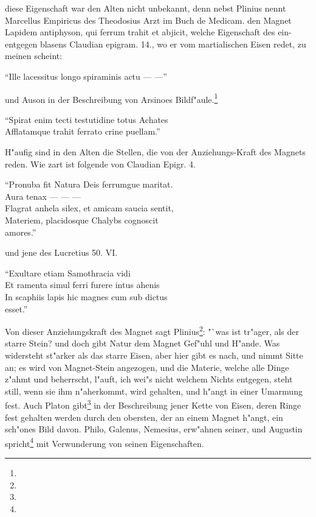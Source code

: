 \documentclass[a4paper, 11pt, oneside, polutonikogreek, german]{article}
\begin{document}
diese Eigenschaft war den Alten nicht unbekannt, denn nebst Plinius nennt Marcellus Empiricus des Theodosius Arzt im Buch de Medicam. den Magnet Lapidem antiphyson, qui ferrum trahit et abjicit, welche Eigenschaft des ein-entgegen blasens Claudian epigram. 14., wo er vom martialischen Eisen redet, zu meinen scheint:

"`Ille lacessitus longo spiraminis actu --- ---"'

und Auson in der Beschreibung von Arsinoes Bildf"aule.\footnote{}

"`Spirat enim tecti testutidine totus Achates\\
\hspace*{0.5cm} Afflatamque trahit ferrato crine puellam."'

H"aufig sind in den Alten die Stellen, die von der Anziehungs-Kraft des Magnets reden. Wie zart ist folgende von Claudian Epigr. 4.

"`Pronuba fit Natura Deis ferrumgue maritat.\\
\hspace*{0.5cm} Aura tenax --- --- ---\\
\hspace*{0.5cm} Flagrat anhela silex, et amicam saucia sentit,\\
\hspace*{0.5cm} Materiem, placidosque Chalybs cognoscit\\
\hspace*{1.5cm} amores."'

und jene des Lucretius 50. VI.

"`Exultare etiam Samothracia vidi\\
\hspace*{0.5cm} Et ramenta simul ferri furere intus ahenis\\
\hspace*{0.5cm} In scaphiis lapis hic magnes cum sub dictus\\
\hspace*{1.5cm} esset."'

Von dieser Anziehungskraft des Magnet sagt Plinius\footnote{}: "`was ist tr"ager, als der starre Stein? und doch gibt Natur dem Magnet Gef"uhl und H"ande. Was widersteht st"arker als das starre Eisen, aber hier gibt es nach, und nimmt Sitte an; es wird von Magnet-Stein angezogen, und die Materie, welche alle Dinge z"ahmt und beherrscht, l"auft, ich wei"s nicht welchem Nichts entgegen, steht still, wenn sie ihm n"aherkommt, wird gehalten, und h"angt in einer Umarmung fest. Auch Platon gibt\footnote{} in der Beschreibung jener Kette von Eisen, deren Ringe fest gehalten werden durch den obersten, der an einem Magnet h"angt, ein sch"ones Bild davon. Philo, Galenus, Nemesius, erw"ahnen seiner, und Augustin spricht\footnote{} mit Verwunderung von seinen Eigenschaften.
\end{document}
